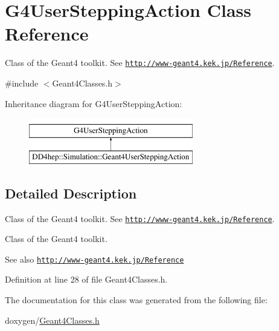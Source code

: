 \hypertarget{class_g4_user_stepping_action}{}\section{G4\+User\+Stepping\+Action Class Reference}
\label{class_g4_user_stepping_action}


Class of the Geant4 toolkit. See \href{http://www-geant4.kek.jp/Reference}{\tt http\+://www-\/geant4.\+kek.\+jp/\+Reference}.  




{\ttfamily \#include $<$Geant4\+Classes.\+h$>$}

Inheritance diagram for G4\+User\+Stepping\+Action\+:\begin{figure}[H]
\begin{center}
\leavevmode
\includegraphics[height=2.000000cm]{class_g4_user_stepping_action}
\end{center}
\end{figure}


\subsection{Detailed Description}
Class of the Geant4 toolkit. See \href{http://www-geant4.kek.jp/Reference}{\tt http\+://www-\/geant4.\+kek.\+jp/\+Reference}. 

Class of the Geant4 toolkit. \begin{DoxySeeAlso}{See also}
\href{http://www-geant4.kek.jp/Reference}{\tt http\+://www-\/geant4.\+kek.\+jp/\+Reference} 
\end{DoxySeeAlso}


Definition at line 28 of file Geant4\+Classes.\+h.



The documentation for this class was generated from the following file\+:\begin{DoxyCompactItemize}
\item 
doxygen/\hyperlink{_geant4_classes_8h}{Geant4\+Classes.\+h}\end{DoxyCompactItemize}
